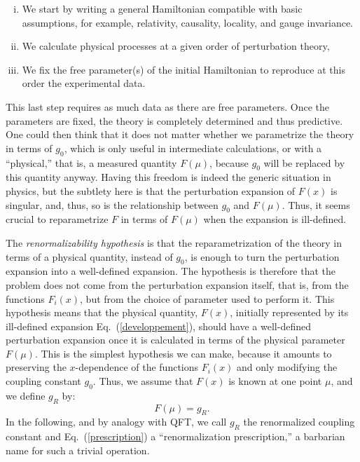 \documentclass[floatfix,preprintnumbers,amsmath,amssymb,prb,12pt]{revtex4-1}
\begin{document}
\begin{enumerate}[(i)]

\item We start by writing
a general Hamiltonian compatible with basic 
assumptions, for example, relativity, causality, locality, and gauge
invariance.

\item We calculate physical processes at a given order of
perturbation theory, 

\item We fix the free parameter(s) of the initial Hamiltonian to
reproduce at this order the experimental data.

\end{enumerate}

This last step requires as much data as there are free parameters.
Once the parameters are fixed, the theory is completely determined
and thus predictive. One could then think that it does not matter
whether we parametrize the theory in terms of $g_0$, which
is only useful in intermediate calculations, or with a
``physical,'' that is, a measured quantity
$F(\mu)$, because $g_0$ will be replaced by this quantity anyway.
Having this freedom is indeed the generic situation in physics,
but the subtlety here is that the perturbation expansion of $F(x)$
is singular, and, thus, so is the relationship between $g_0$ and
$F(\mu)$. Thus, it seems crucial to reparametrize $F$ in terms of
$F(\mu)$ when the expansion is ill-defined.

The {\em renormalizability hypothesis} is 
that the reparametrization of the theory in terms of a physical
quantity, instead of $g_0$, is enough to turn the perturbation
expansion into a well-defined expansion. The hypothesis is
therefore that the problem does not come from the perturbation
expansion itself, that is, from the functions $F_i(x)$, but from
the choice of parameter used to perform it. This hypothesis 
means that the physical quantity, $F(x)$, initially represented by
its ill-defined expansion Eq.~(\ref{developpement}), should have a
well-defined perturbation expansion once it is calculated in terms
of the physical parameter
$F(\mu)$. This is the simplest hypothesis we can make, because
it amounts to preserving the $x$-dependence of the functions
$F_i(x)$ and only modifying the coupling constant $g_0$.
Thus, we assume that $F(x)$ is known at one point $\mu$, and we
define $g_R$ by:
\begin{equation}
F(\mu)=g_R.
\label{prescription}
\end{equation}
In the following, and by analogy
with QFT, we call $g_R$ the renormalized coupling constant
and Eq.~(\ref{prescription}) a ``renormalization prescription,'' a
barbarian name for such a trivial operation. 
\end{document}
